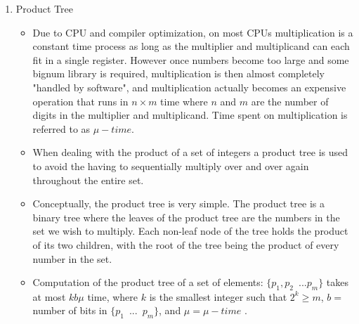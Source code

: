 \documentclass{article}
\begin{document}
        \begin{enumerate}

          \item Product Tree \\
            \begin{itemize}
              \item Due to CPU and compiler optimization, on most CPUs multiplication is a constant time process as long as the multiplier and multiplicand can each fit in a single register.  However once numbers become too large and some bignum library is required, multiplication is then almost completely "handled by software", and multiplication actually becomes an expensive operation that runs in $n \times m$ time where $n$ and $m$ are the number of digits in the multiplier and multiplicand.  Time spent on multiplication is referred to as $\mu -time$.
              \item When dealing with the product of a set of integers a product tree is used to avoid the having to sequentially multiply over and over again throughout the entire set.
              \item Conceptually, the product tree is very simple.  The product tree is a binary tree where the leaves of the product tree are the numbers in the set we wish to multiply.  Each non-leaf node of the tree holds the product of its two children, with the root of the tree being the product of every number in the set.
              \item Computation of the product tree of a set of elements: $\{p_1, p_2 \enspace ... p_m\}$ takes at most $kb\mu$ time, where $k$ is the smallest integer such that $2^k \geq m$, $b =$ number of bits in $\{p_1 \enspace ... \enspace p_m\}$, and $\mu = \mu -time$ \autocite{Bernstein2004}.
            \end{itemize}


\end{enumerate}
\end{document}
